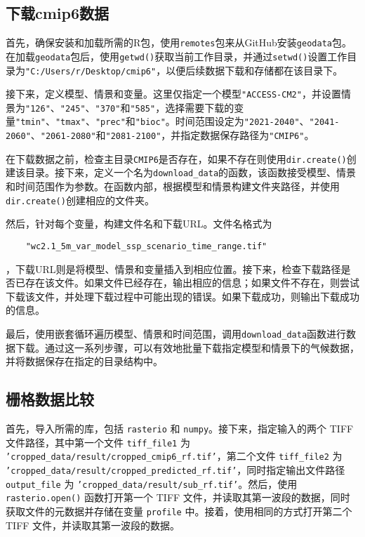 \documentclass{article}
\begin{document}
\subsection{下载cmip6数据}
首先，确保安装和加载所需的R包，使用\texttt{remotes}包来从GitHub安装\texttt{geodata}包。在加载\texttt{geodata}包后，使用\texttt{getwd()}获取当前工作目录，并通过\texttt{setwd()}设置工作目录为\texttt{"C:/Users/r/Desktop/cmip6"}，以便后续数据下载和存储都在该目录下。

接下来，定义模型、情景和变量。这里仅指定一个模型\texttt{"ACCESS-CM2"}，并设置情景为\texttt{"126"}、\texttt{"245"}、\texttt{"370"}和\texttt{"585"}，选择需要下载的变量\texttt{"tmin"}、\texttt{"tmax"}、\texttt{"prec"}和\texttt{"bioc"}。时间范围设定为\texttt{"2021-2040"}、\texttt{"2041-2060"}、\texttt{"2061-2080"}和\texttt{"2081-2100"}，并指定数据保存路径为\texttt{"CMIP6"}。

在下载数据之前，检查主目录\texttt{CMIP6}是否存在，如果不存在则使用\texttt{dir.create()}创建该目录。接下来，定义一个名为\texttt{download\_data}的函数，该函数接受模型、情景和时间范围作为参数。在函数内部，根据模型和情景构建文件夹路径，并使用\texttt{dir.create()}创建相应的文件夹。

然后，针对每个变量，构建文件名和下载URL。文件名格式为
\begin{lstlisting}
	"wc2.1_5m_var_model_ssp_scenario_time_range.tif"
\end{lstlisting}
，下载URL则是将模型、情景和变量插入到相应位置。接下来，检查下载路径是否已存在该文件。如果文件已经存在，输出相应的信息；如果文件不存在，则尝试下载该文件，并处理下载过程中可能出现的错误。如果下载成功，则输出下载成功的信息。

最后，使用嵌套循环遍历模型、情景和时间范围，调用\texttt{download\_data}函数进行数据下载。通过这一系列步骤，可以有效地批量下载指定模型和情景下的气候数据，并将数据保存在指定的目录结构中。


\subsection{栅格数据比较}
首先，导入所需的库，包括 \texttt{rasterio} 和 \texttt{numpy}。接下来，指定输入的两个 TIFF 文件路径，其中第一个文件 \texttt{tiff\_file1} 为 \texttt{'cropped\_data/result/cropped\_cmip6\_rf.tif'}，第二个文件 \texttt{tiff\_file2} 为 \texttt{'cropped\_data/result/cropped\_predicted\_rf.tif'}，同时指定输出文件路径 \texttt{output\_file} 为 \texttt{'cropped\_data/result/sub\_rf.tif'}。然后，使用 \texttt{rasterio.open()} 函数打开第一个 TIFF 文件，并读取其第一波段的数据，同时获取文件的元数据并存储在变量 \texttt{profile} 中。接着，使用相同的方式打开第二个 TIFF 文件，并读取其第一波段的数据。
\end{document}
